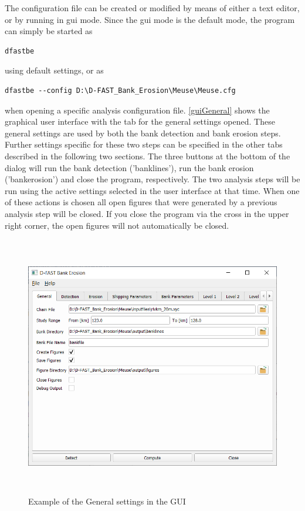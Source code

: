 The configuration file can be created or modified by means of either a text editor, or by \dfastbe running in gui mode.
Since the gui mode is the default mode, the program can simply be started as

\begin{Verbatim}
dfastbe
\end{Verbatim}

using default settings, or as

\begin{Verbatim}
dfastbe --config D:\D-FAST_Bank_Erosion\Meuse\Meuse.cfg
\end{Verbatim}

when opening a specific analysis configuration file.
\autoref{guiGeneral} shows the graphical user interface with the tab for the general settings opened.
These general settings are used by both the bank detection and bank erosion steps.
Further settings specific for these two steps can be specified in the other tabs described in the following two sections.
The three buttons at the bottom of the dialog will run the bank detection ('banklines'), run the bank erosion ('bankerosion') and close the program, respectively.
The two analysis steps will be run using the active settings selected in the user interface at that time.
When one of these actions is chosen all open figures that were generated by a previous analysis step will be closed.
If you close the program via the cross in the upper right corner, the open figures will not automatically be closed.

\begin{figure}[!ht]
	\center
	\includegraphics[width=\textwidth,height=11.4cm]{figures/gui1.png}
	\caption{Example of the General settings in the GUI}
	\label{guiGeneral}
\end{figure}

